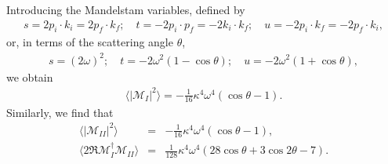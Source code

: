 \documentclass[11pt,showpacs,preprintnumbers,amsmath,amssymb,prd,nofootinbib,superscriptaddress]{revtex4-2}
\begin{document}
Introducing the Mandelstam variables, defined by
\begin{eqnarray}
    s=2p_i\cdot k_i=2p_f\cdot k_f;\quad t=-2p_i\cdot p_f=-2k_i\cdot k_f;\quad u=-2p_i\cdot k_f=-2p_f\cdot k_i,
\end{eqnarray}
or, in terms of the scattering angle $\theta$,
\begin{eqnarray}
    s=(2\omega)^2; \quad t=-2\omega^2(1-\cos{\theta});\quad u=-2\omega^2(1+\cos{\theta}),
\end{eqnarray}
we obtain
\begin{eqnarray}
    \langle|\mathcal{M}_I|^2\rangle=-\frac{1}{16} \kappa ^4 \omega ^4 (\cos {\theta }-1).
\end{eqnarray}
Similarly, we find that
\begin{eqnarray}
    \langle|\mathcal{M}_{II}|^2\rangle&=&-\frac{1}{16} \kappa ^4 \omega ^4 (\cos {\theta }-1),\\
     \langle2\Re\mathcal{M}_I^\dagger\mathcal{M}_{II}\rangle&=&\frac{1}{128} \kappa ^4 \omega ^4 (28\cos {\theta }+3 \cos {2\theta }-7).
\end{eqnarray}
\end{document}
